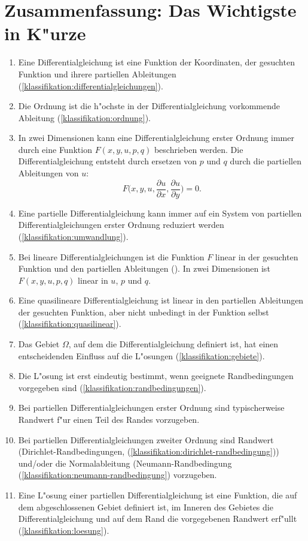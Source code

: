 \section{Zusammenfassung: Das Wichtigste in K"urze}
\begin{enumerate}
\item Eine Differentialgleichung ist eine Funktion
der Koordinaten, der gesuchten Funktion und ihrere partiellen Ableitungen
(\ref{klassifikation:differentialgleichungen}).
\item Die Ordnung ist die h"ochste in der Differentialgleichung vorkommende
Ableitung (\ref{klassifikation:ordnung}).
\item In zwei Dimensionen kann eine Differentialgleichung erster Ordnung
immer durch eine Funktion $F(x,y,u,p,q)$ beschrieben werden. Die
Differentialgleichung entsteht durch ersetzen von $p$ und $q$ durch
die partiellen Ableitungen von $u$:
\[
F\biggl(
x,y, u,
\frac{\partial u}{\partial x},
\frac{\partial u}{\partial y}
\biggr)=0.
\]
\item Eine partielle Differentialgleichung kann immer auf ein System
von partiellen Differentialgleichungen erster Ordnung reduziert werden
(\ref{klassifikation:umwandlung}).
\item Bei lineare Differentialgleichungen ist die Funktion $F$ linear
in der gesuchten Funktion und den partiellen Ableitungen
(\label{klassifikation:linear}). In zwei
Dimensionen ist $F(x,y,u,p,q)$ linear in $u$, $p$ und $q$.
\item Eine quasilineare Differentialgleichung ist linear in den
partiellen Ableitungen der gesuchten Funktion, aber nicht unbedingt
in der Funktion selbst (\ref{klassifikation:quasilinear}).
\item Das Gebiet $\Omega$, auf dem die Differentialgleichung definiert
ist, hat einen entscheidenden Einfluss auf die L"osungen (\ref{klassifikation:gebiete}).
\item Die L"osung ist erst eindeutig bestimmt, wenn geeignete Randbedingungen
vorgegeben sind (\ref{klassifikation:randbedingungen}). 
\item Bei partiellen Differentialgleichungen erster Ordnung sind typischerweise
Randwert f"ur einen Teil des Randes vorzugeben.
\item Bei partiellen Differentialgleichungen zweiter Ordnung sind
Randwert (Dirichlet-Rand\-bedingungen,
(\ref{klassifikation:dirichlet-randbedingung}))
und/oder die Normalableitung
(Neumann-Randbedingung (\ref{klassifikation:neumann-randbedingung})
vorzugeben.
\item Eine L"osung einer partiellen Differentialgleichung ist eine
Funktion, die auf dem abgeschlossenen Gebiet definiert ist, im Inneren
des Gebietes die Differentialgleichung und auf dem Rand
die vorgegebenen Randwert erf"ullt (\ref{klassifikation:loesung}).

\end{enumerate}
